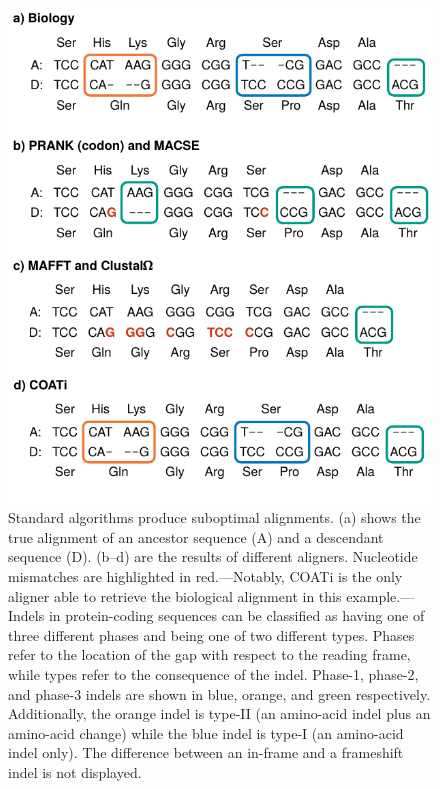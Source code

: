 \documentclass[12pt,letterpaper]{article}
\begin{document}
\begin{figure}[h!]
    \centering%
    \includegraphics[scale=1]{figures/fig-aln.pdf}
    \par
    \caption{
        Standard algorithms produce suboptimal alignments.
        (a) shows the true alignment of an ancestor sequence (A) and a descendant sequence (D).
        (b--d) are the results of different aligners. Nucleotide mismatches are highlighted in red.---Notably, COATi is the only aligner able to retrieve the biological alignment in this example.---%
        Indels in protein-coding sequences can be classified as having one of three different phases and being one of two different types.
        Phases refer to the location of the gap with respect to the reading frame, while types refer to the consequence of the indel.
        Phase-1, phase-2, and phase-3 indels are shown in blue, orange, and green respectively.
        Additionally, the orange indel is type-II (an amino-acid indel plus an amino-acid change) while the blue indel is type-I (an amino-acid indel only). The difference between an in-frame and a frameshift indel is not displayed.
        }
    \label{fig:aln}
\end{figure}
\end{document}
